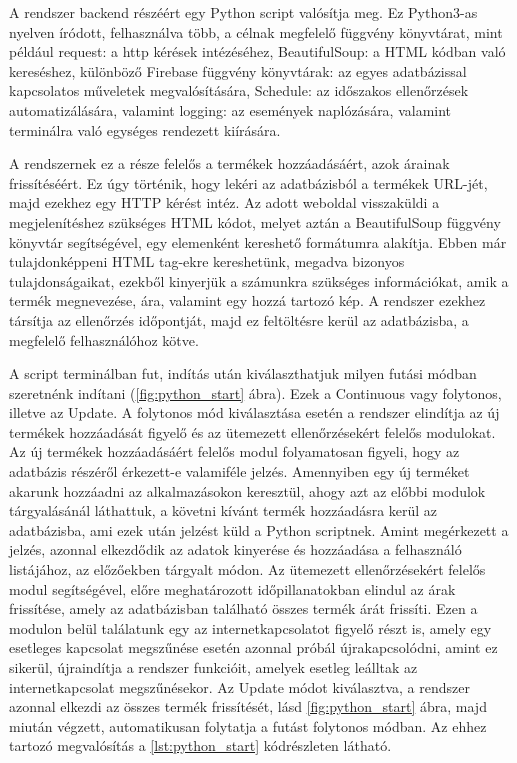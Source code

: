 A rendszer backend részéért egy Python script valósítja meg. Ez Python3-as nyelven íródott, felhasználva több, a célnak megfelelő függvény könyvtárat, mint például request: a http kérések intézéséhez, BeautifulSoup: a HTML kódban való kereséshez, különböző Firebase függvény könyvtárak: az egyes adatbázissal kapcsolatos műveletek megvalósítására, Schedule: az időszakos ellenőrzések automatizálására, valamint logging: az események naplózására, valamint terminálra való egységes rendezett kiírására.

A rendszernek ez a része felelős a termékek hozzáadásáért, azok árainak frissítéséért. Ez úgy történik, hogy lekéri az adatbázisból a termékek URL-jét, majd ezekhez egy HTTP kérést intéz. Az adott weboldal visszaküldi a megjelenítéshez szükséges HTML kódot, melyet aztán a BeautifulSoup függvény könyvtár segítségével, egy elemenként kereshető formátumra alakítja. Ebben már tulajdonképpeni HTML tag-ekre kereshetünk, megadva bizonyos tulajdonságaikat, ezekből kinyerjük a számunkra szükséges információkat, amik a termék megnevezése, ára, valamint egy hozzá tartozó kép. A rendszer ezekhez társítja az ellenőrzés időpontját, majd ez feltöltésre kerül az adatbázisba, a megfelelő felhasználóhoz kötve. 

A script terminálban fut, indítás után kiválaszthatjuk milyen futási módban szeretnénk indítani (\ref{fig:python_start} ábra). Ezek a Continuous vagy folytonos, illetve az Update. A folytonos mód kiválasztása esetén a rendszer elindítja az új termékek hozzáadását figyelő és az ütemezett ellenőrzésekért felelős modulokat. Az új termékek hozzáadásáért felelős modul folyamatosan figyeli, hogy az adatbázis részéről érkezett-e valamiféle jelzés. Amennyiben egy új terméket akarunk hozzáadni az alkalmazásokon keresztül, ahogy azt az előbbi modulok tárgyalásánál láthattuk, a követni kívánt termék hozzáadásra kerül az adatbázisba, ami ezek után jelzést küld a Python scriptnek. Amint megérkezett a jelzés, azonnal elkezdődik az adatok kinyerése és hozzáadása a felhasználó listájához, az előzőekben tárgyalt módon. Az ütemezett ellenőrzésekért felelős modul segítségével, előre meghatározott időpillanatokban elindul az árak frissítése, amely az adatbázisban található összes termék árát frissíti. Ezen a modulon belül találatunk egy az internetkapcsolatot figyelő részt is, amely egy esetleges kapcsolat megszűnése esetén azonnal próbál újrakapcsolódni, amint ez sikerül, újraindítja a rendszer funkcióit, amelyek esetleg leálltak az internetkapcsolat megszűnésekor. Az Update módot kiválasztva, a rendszer azonnal elkezdi az összes termék frissítését, lásd \ref{fig:python_start} ábra, majd miután végzett, automatikusan folytatja a futást folytonos módban. Az ehhez tartozó megvalósítás a \ref{lst:python_start} kódrészleten látható.


